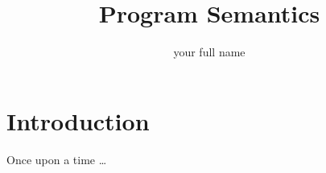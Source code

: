 \title[short title]{Program Semantics}
\author[short name]{your full name}

\frame{\maketitle}
\section{Introduction}  
\begin{frame}
  Once upon a time \dots 
\end{frame}

